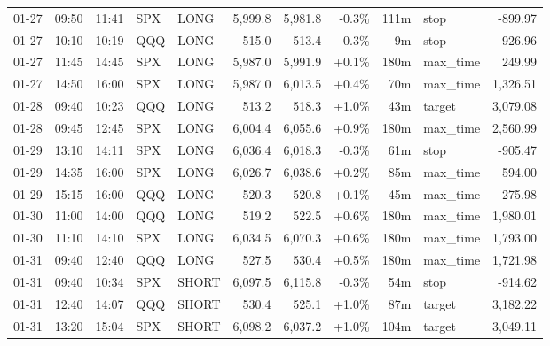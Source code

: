 \documentclass[11pt,a4paper,twoside]{article}
\begin{document}
\begin{center}
\begin{longtable}{>{\color{txtmain}}l l l l l r r r r >{\color{txtmain}}l r}
01-27 & 09:50 & 11:41 & SPX & LONG & 5,999.8 & 5,981.8 & \textcolor{lossred}{-0.3\%} & 111m & stop & \textcolor{lossred}{-899.97} \\
01-27 & 10:10 & 10:19 & QQQ & LONG & 515.0 & 513.4 & \textcolor{lossred}{-0.3\%} & 9m & stop & \textcolor{lossred}{-926.96} \\
01-27 & 11:45 & 14:45 & SPX & LONG & 5,987.0 & 5,991.9 & \textcolor{wingreen}{+0.1\%} & 180m & max\_time & \textcolor{wingreen}{249.99} \\
01-27 & 14:50 & 16:00 & SPX & LONG & 5,987.0 & 6,013.5 & \textcolor{wingreen}{+0.4\%} & 70m & max\_time & \textcolor{wingreen}{1,326.51} \\
01-28 & 09:40 & 10:23 & QQQ & LONG & 513.2 & 518.3 & \textcolor{wingreen}{+1.0\%} & 43m & target & \textcolor{wingreen}{3,079.08} \\
01-28 & 09:45 & 12:45 & SPX & LONG & 6,004.4 & 6,055.6 & \textcolor{wingreen}{+0.9\%} & 180m & max\_time & \textcolor{wingreen}{2,560.99} \\
01-29 & 13:10 & 14:11 & SPX & LONG & 6,036.4 & 6,018.3 & \textcolor{lossred}{-0.3\%} & 61m & stop & \textcolor{lossred}{-905.47} \\
01-29 & 14:35 & 16:00 & SPX & LONG & 6,026.7 & 6,038.6 & \textcolor{wingreen}{+0.2\%} & 85m & max\_time & \textcolor{wingreen}{594.00} \\
01-29 & 15:15 & 16:00 & QQQ & LONG & 520.3 & 520.8 & \textcolor{wingreen}{+0.1\%} & 45m & max\_time & \textcolor{wingreen}{275.98} \\
01-30 & 11:00 & 14:00 & QQQ & LONG & 519.2 & 522.5 & \textcolor{wingreen}{+0.6\%} & 180m & max\_time & \textcolor{wingreen}{1,980.01} \\
01-30 & 11:10 & 14:10 & SPX & LONG & 6,034.5 & 6,070.3 & \textcolor{wingreen}{+0.6\%} & 180m & max\_time & \textcolor{wingreen}{1,793.00} \\
01-31 & 09:40 & 12:40 & QQQ & LONG & 527.5 & 530.4 & \textcolor{wingreen}{+0.5\%} & 180m & max\_time & \textcolor{wingreen}{1,721.98} \\
01-31 & 09:40 & 10:34 & SPX & SHORT & 6,097.5 & 6,115.8 & \textcolor{lossred}{-0.3\%} & 54m & stop & \textcolor{lossred}{-914.62} \\
01-31 & 12:40 & 14:07 & QQQ & SHORT & 530.4 & 525.1 & \textcolor{wingreen}{+1.0\%} & 87m & target & \textcolor{wingreen}{3,182.22} \\
01-31 & 13:20 & 15:04 & SPX & SHORT & 6,098.2 & 6,037.2 & \textcolor{wingreen}{+1.0\%} & 104m & target & \textcolor{wingreen}{3,049.11} \\

\end{longtable}
\end{center}
\end{document}
